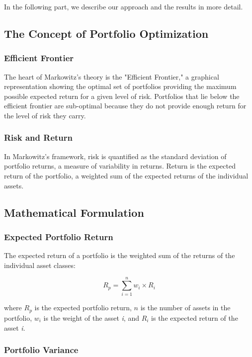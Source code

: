 \documentclass{article}
\begin{document}
In the following part, we describe our approach and the results in more detail. 

\subsection{The Concept of Portfolio Optimization}

\subsubsection*{Efficient Frontier}

The heart of Markowitz's theory is the "Efficient Frontier," a graphical representation showing the optimal set of portfolios providing the maximum possible expected return for a given level of risk. Portfolios that lie below the efficient frontier are sub-optimal because they do not provide enough return for the level of risk they carry.

\subsubsection*{Risk and Return}

In Markowitz's framework, risk is quantified as the standard deviation of portfolio returns, a measure of variability in returns. Return is the expected return of the portfolio, a weighted sum of the expected returns of the individual assets.

\subsection{Mathematical Formulation}

\subsubsection*{Expected Portfolio Return}

The expected return of a portfolio is the weighted sum of the returns of the individual asset classes:

\begin{equation}
R_p = \sum_{i=1}^{n} w_i \times R_i
\end{equation}

where \( R_p \) is the expected portfolio return, \( n \) is the number of assets in the portfolio, \( w_i \) is the weight of the asset \textit{i}, and \( R_i \) is the expected return of the asset \textit{i}.

\subsubsection*{Portfolio Variance}
\end{document}
